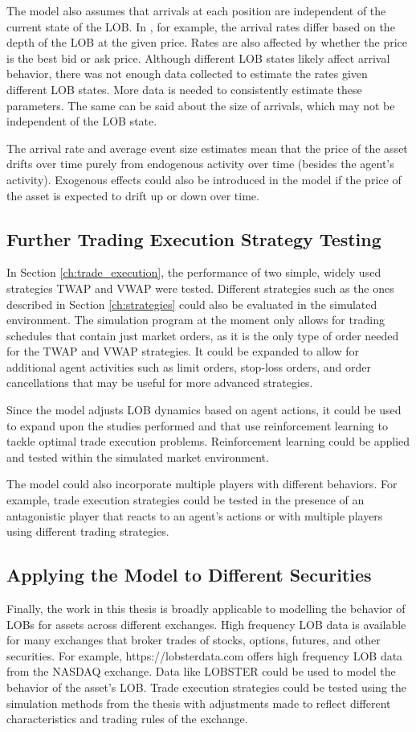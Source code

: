 The model also assumes that arrivals at each position are independent of the current state of the LOB. In \cite{A6}, for example, the arrival rates differ based on the depth of the LOB at the given price. Rates are also affected by whether the price is the best bid or ask price. Although different LOB states likely affect arrival behavior, there was not enough data collected to estimate the rates given different LOB states. More data is needed to consistently estimate these parameters. The same can be said about the size of arrivals, which may not be independent of the LOB state.

The arrival rate and average event size estimates mean that the price of the asset drifts over time purely from endogenous activity over time (besides the agent's activity). Exogenous effects could also be introduced in the model if the price of the asset is expected to drift up or down over time. 

\subsection{Further Trading Execution Strategy Testing}
In Section \ref{ch:trade_execution}, the performance of two simple, widely used strategies TWAP and VWAP were tested. Different strategies such as the ones described in Section \ref{ch:strategies} could also be evaluated in the simulated environment. The simulation program at the moment only allows for trading schedules that contain just market orders, as it is the only type of order needed for the TWAP and VWAP strategies. It could be expanded to allow for additional agent activities such as limit orders, stop-loss orders, and order cancellations that may be useful for more advanced strategies. 

Since the model adjusts LOB dynamics based on agent actions, it could be used to expand upon the studies performed \cite{A3} and \cite{A4} that use reinforcement learning to tackle optimal trade execution problems. Reinforcement learning could be applied and tested within the simulated market environment. 

The model could also incorporate multiple players with different behaviors. For example, trade execution strategies could be tested in the presence of an antagonistic player that reacts to an agent's actions or with multiple players using different trading strategies.

\subsection{Applying the Model to Different Securities}
Finally, the work in this thesis is broadly applicable to modelling the behavior of LOBs for assets across different exchanges. High frequency LOB data is available for many exchanges that broker trades of stocks, options, futures, and other securities. For example, https://lobsterdata.com offers high frequency LOB data from the NASDAQ exchange. Data like LOBSTER could be used to model the behavior of the asset's LOB. Trade execution strategies could be tested using the simulation methods from the thesis with adjustments made to reflect different characteristics and trading rules of the exchange.